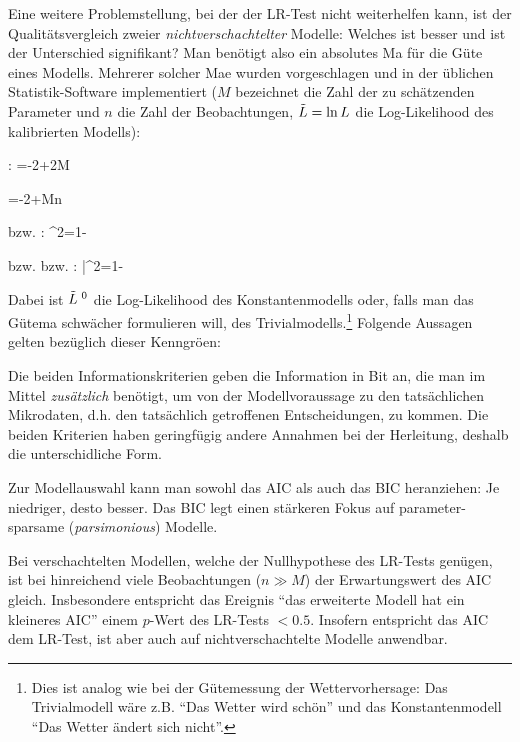 Eine weitere Problemstellung, bei der der LR-Test nicht weiterhelfen
kann, ist der Qualit\"atsvergleich zweier \emph{nichtverschachtelter}
Modelle: Welches ist besser und ist der Unterschied signifikant? Man
ben\"otigt also ein absolutes Ma\3 f\"ur die G\"ute eines
Modells. Mehrerer solcher Ma\3e wurden vorgeschlagen und in der
\"ublichen Statistik-Software implementiert ($M$ bezeichnet die Zahl der zu
sch\"atzenden Parameter und $n$ die Zahl der Beobachtungen,
$\tilde{L}=\ln L$ die Log-Likelihood des kalibrierten Modells):


\bi
\item {}:
  \be {}=-2\tilL+2M \ee

\item {}
   \be {}=-2\tilL+M\ln n \ee

\item {} bzw. :
   \be \rho^2=1- \ee
 
\item {} bzw.  bzw. :
  \be \bar{\rho}^2=1-\ee
\ei
   
Dabei ist $\tilde{L}^{{\mbox{ {\scriptsize \hspace{-0.2ex}0}}}}$ die Log-Likelihood des Konstantenmodells
oder, falls man das G\"utema\3 schw\"acher formulieren will, des
Trivialmodells.\footnote{Dies ist 
analog wie bei der G\"utemessung der Wettervorhersage: Das
Trivialmodell w\"are z.B. ``Das Wetter wird sch\"on'' und das
Konstantenmodell ``Das Wetter \"andert sich nicht''.}
Folgende Aussagen gelten bez\"uglich dieser Kenngr\"o\3en:

\bi
\item Die beiden Informationskriterien geben die Information in Bit
  an, die man im Mittel \emph{zus\"atzlich} ben\"otigt, um von der
  Modellvoraussage zu den tats\"achlichen Mikrodaten,
  d.h. den tats\"achlich getroffenen Entscheidungen, zu kommen. Die
  beiden Kriterien haben geringf\"ugig andere Annahmen bei der Herleitung,
  deshalb die unterschidliche Form.

\item Zur Modellauswahl kann man sowohl das AIC als auch das BIC
  heranziehen: Je niedriger, desto besser. Das BIC legt einen
  st\"arkeren Fokus auf parameter-sparsame (\emph{parsimonious})
  Modelle.

\item Bei verschachtelten Modellen, welche der Nullhypothese des
  LR-Tests gen\"ugen, ist bei hinreichend viele Beobachtungen
  ($n\gg  M$) der Erwartungswert des AIC
    gleich. Insbesondere entspricht das Ereignis ``das erweiterte
    Modell hat ein kleineres AIC'' einem $p$-Wert des LR-Tests
    $<0.5$. Insofern entspricht das AIC dem LR-Test, ist aber auch auf
    nichtverschachtelte Modelle anwendbar. 

